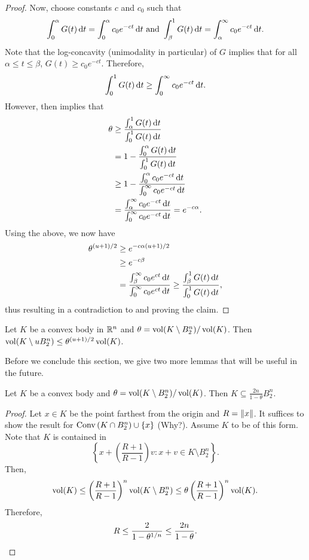 \begin{proof}
	Now, choose constants $c$ and $c_0$ such that
	\[ \int_0^\alpha G(t)\operatorname{d}\!{t} = \int_0^\alpha c_0e^{-ct}\operatorname{d}\!{t} \text{ and } \int_\beta^1 G(t)\operatorname{d}\!{t} = \int_\alpha^\infty c_0e^{-ct}\operatorname{d}\!{t}. \]
	Note that the log-concavity (unimodality in particular) of $G$ implies that for all $\alpha\leq t\leq\beta$, $G(t)\geq c_0e^{-ct}$. Therefore,
	\[ \int_0^1 G(t)\operatorname{d}\!{t} \geq \int_0^\infty c_0e^{-ct}\operatorname{d}\!{t}. \]
	However,  then implies that
	\begin{align*}
		\theta &\geq \frac{\int_\alpha^1 G(t)\d{t}}{\int_0^1 G(t)\d{t}} \\
			&= 1 - \frac{\int_0^\alpha G(t)\d{t}}{\int_0^1 G(t)\d{t}} \\
			&\geq 1 - \frac{\int_0^\alpha c_0e^{-ct}\d{t}}{\int_0^\infty c_0e^{-ct}\d{t}} \\
			&= \frac{\int_\alpha^\infty c_0e^{-ct}\d{t}}{\int_0^\infty c_0e^{-ct}\d{t}} = e^{-c\alpha}.
	\end{align*}
	Using the above, we now have
	\begin{align*}
		\theta^{(u+1)/2} &\geq e^{-c\alpha(u+1)/2} \\
			&\geq e^{-c\beta} \\
			&= \frac{\int_\beta^\infty c_0e^{ct}\operatorname{d}\!{t}}{\int_0^\infty c_0e^{ct}\operatorname{d}\!{t}} \geq \frac{\int_\beta^1 G(t)\operatorname{d}\!{t}}{\int_0^1 G(t)\operatorname{d}\!{t}},
	\end{align*}
	thus resulting in a contradiction to  and proving the claim.
\end{proof}


\begin{corollary}
	\label{inequality integral setminus ball restricted to K}
	Let $K$ be a convex body in $\mathbb{R}^n$ and $\theta=\operatorname{vol}(K\setminus B_2^n)/\operatorname{vol}(K)$. Then $\operatorname{vol}(K\setminus uB_2^n)\leq\theta^{(u+1)/2}\operatorname{vol}(K)$.	
\end{corollary}

Before we conclude this section, we give two more lemmas that will be useful in the future.

\begin{lemma}
	\label{lemma 4.38}
	Let $K$ be a convex body and $\theta=\operatorname{vol}(K\setminus B_2^n)/\operatorname{vol}(K)$. Then $K\subseteq \frac{2n}{1-\theta}B_2^n$.
\end{lemma}
\begin{proof}
	Let $x\in K$ be the point farthest from the origin and $R=\left\lVert x\right\rVert$. It suffices to show the result for $\operatorname{Conv}{(K\cap B_2^n)\cup\{x\}}$ (Why?). Assume $K$ to be of this form.\\
	Note that $K$ is contained in
	\[ \left\{x+\left(\frac{R+1}{R-1}\right) v : x+v\in K\setminus B_2^n\right\}. \]
	Then,
	\[ \operatorname{vol}(K) \leq \left(\frac{R+1}{R-1}\right)^n \operatorname{vol}(K\setminus B_2^n) \leq \theta\left(\frac{R+1}{R-1}\right)^n \operatorname{vol}(K). \]
	Therefore,
	\[ R \leq \frac{2}{1-\theta^{1/n}} \leq \frac{2n}{1-\theta}.\qedhere \]
\end{proof}


